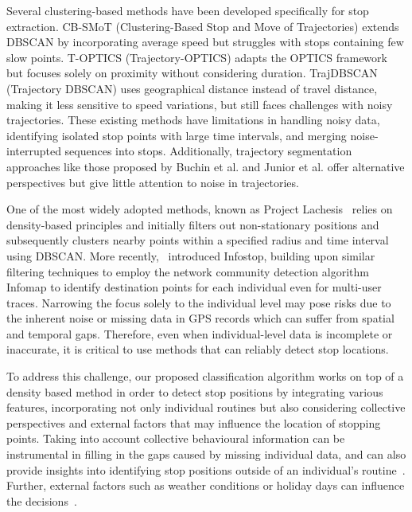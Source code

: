 \documentclass{article}
\begin{document}
Several clustering-based methods have been developed specifically for stop extraction. CB-SMoT (Clustering-Based Stop and Move of Trajectories) \citep{palma2008clustering} extends DBSCAN by incorporating average speed but struggles with stops containing few slow points. T-OPTICS (Trajectory-OPTICS) \citep{zimmermann2009finding} adapts the OPTICS framework but focuses solely on proximity without considering duration. TrajDBSCAN (Trajectory DBSCAN) \citep{tran2011robust} uses geographical distance instead of travel distance, making it less sensitive to speed variations, but still faces challenges with noisy trajectories.
These existing methods have limitations in handling noisy data, identifying isolated stop points with large time intervals, and merging noise-interrupted sequences into stops. Additionally, trajectory segmentation approaches like those proposed by Buchin et al. \citep{buchin2011segmenting} and Junior et al. \citep{soares2015grasp} offer alternative perspectives but give little attention to noise in trajectories.

One of the most widely adopted methods, known as Project Lachesis~\citep{Ramaswamy2004} relies on density-based principles and initially filters out non-stationary positions and subsequently clusters nearby points within a specified radius and time interval using DBSCAN.
More recently,~\citep{Aslak2020} introduced Infostop, building upon similar filtering techniques to employ the network community detection algorithm Infomap to identify destination points for each individual even for multi-user traces.
Narrowing the focus solely to the individual level may pose risks due to the inherent noise or missing data in GPS records which can suffer from spatial and temporal gaps. Therefore, even when individual-level data is incomplete or inaccurate, it is critical to use methods that can reliably detect stop locations.

To address this challenge, our proposed classification algorithm works on top of a density based method in order to detect stop positions by integrating various features, incorporating not only individual routines but also considering collective perspectives and external factors that may influence the location of stopping points.
Taking into account collective behavioural information can be instrumental in filling in the gaps caused by missing individual data, and can also provide insights into identifying stop positions outside of an individual's routine~\citep{Bontorin2024a}.
Further, external factors such as weather conditions or holiday days can influence the decisions~\citep{Massimiliano2021}.
\end{document}
